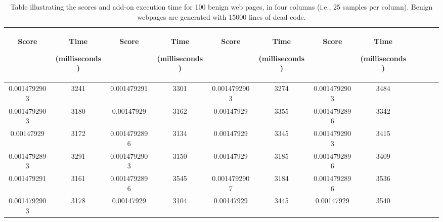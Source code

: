 \begin{table}[h]
\caption[Scores table of benign web pages]{Table illustrating the scores and add-on execution time for 100 benign web pages, in four columns (i.e., 25 samples per column). Benign webpages are generated with 15000 lines of dead code.}
    \label{tab:b15000table}
  \centering
  \begin{tabular}{|c|c|c|c|c|c|c|c|c|c|c|c|} 
  \midrule
 \begin{sideways}Score\end{sideways}& \begin{sideways}Time\end{sideways} \begin{sideways} (milliseconds)\end{sideways}& \begin{sideways}Score\end{sideways}& \begin{sideways}Time\end{sideways}  \begin{sideways}(milliseconds)\end{sideways}& \begin{sideways}Score\end{sideways}& \begin{sideways}Time\end{sideways}  \begin{sideways}(milliseconds)\end{sideways}& \begin{sideways}Score\end{sideways}& \begin{sideways}Time\end{sideways}  \begin{sideways} (milliseconds)\end{sideways}\\
\midrule
0.0014792903&3241&0.001479291&3301&0.0014792903&3274&0.0014792903&3484\\
\midrule
0.0014792903&3180&0.00147929&3162&0.00147929&3355&0.0014792896&3342\\
\midrule
0.00147929&3172&0.0014792896&3134&0.00147929&3345&0.0014792903&3415\\
\midrule
0.0014792893&3291&0.0014792903&3150&0.00147929&3185&0.0014792896&3409\\
\midrule
0.001479291&3161&0.0014792896&3545&0.0014792907&3184&0.0014792896&3536\\
\midrule
0.0014792903&3178&0.00147929&3104&0.00147929&3445&0.00147929&3540\\

\end{tabular}
\end{table}
